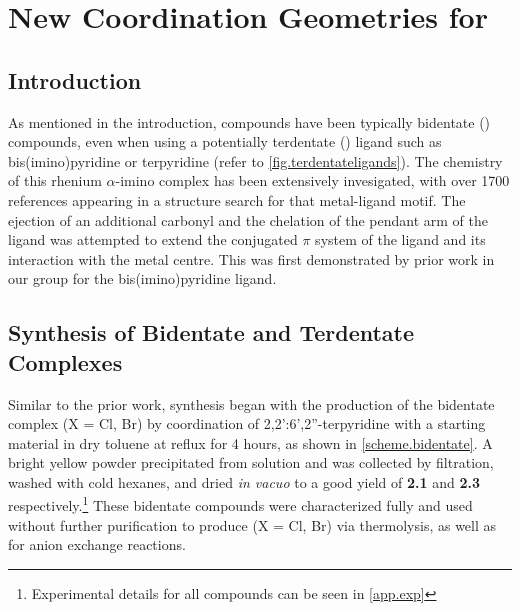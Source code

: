 \chapter{New Coordination Geometries for \texorpdfstring{}{Rhenium (I)}}\label{chap.newchem}
\section{Introduction}

As mentioned in the introduction,  compounds have been typically bidentate () compounds, even when using a potentially terdentate () ligand such as bis(imino)pyridine or terpyridine (refer to \autoref{fig.terdentateligands}). The chemistry of this rhenium $\alpha$-imino complex has been extensively invesigated, with over 1700 references appearing in a structure search for that metal-ligand motif. The ejection of an additional carbonyl and the chelation of the pendant arm of the ligand was attempted to extend the conjugated $\pi$ system of the ligand and its interaction with the metal centre. This was first demonstrated by prior work in our group for the bis(imino)pyridine ligand\autocite{jurca2013}. 

\section{Synthesis of Bidentate and Terdentate \texorpdfstring{}{Rhenium (I)} Complexes}

Similar to the prior work, synthesis began with the production of the bidentate complex  (X = Cl, Br) by coordination of 2,2':6',2''-terpyridine with a  starting material in dry toluene at reflux for 4 hours, as shown in \autoref{scheme.bidentate}. A bright yellow powder precipitated from solution and was collected by filtration, washed with cold hexanes, and dried \textit{in vacuo} to a good yield of \textbf{2.1} and \textbf{2.3} respectively.\footnote{Experimental details for all compounds can be seen in \autoref{app.exp} } These bidentate compounds were characterized fully and used without further purification to produce  (X = Cl, Br) via thermolysis, as well as for anion exchange reactions. 

